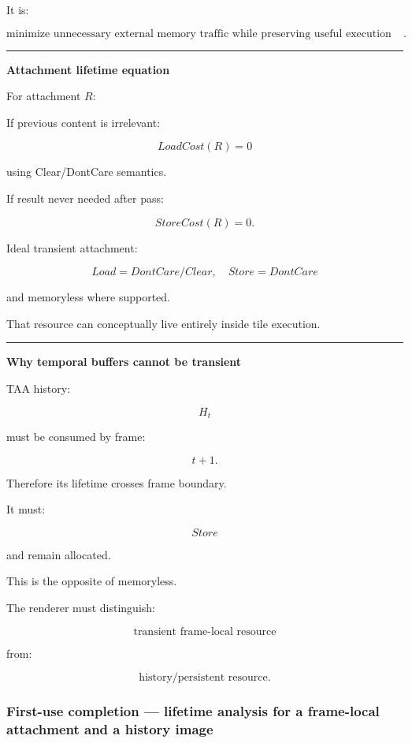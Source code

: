 It is:

\[
\boxed{
\text{minimize unnecessary external memory traffic while preserving useful execution structure}.
}
\]

\begin{center}\rule{0.5\linewidth}{0.5pt}\end{center}

\textbf{Attachment lifetime equation}

For attachment \(R\):

If previous content is irrelevant:

\[
LoadCost(R)=0
\]

using Clear/DontCare semantics.

If result never needed after pass:

\[
StoreCost(R)=0.
\]

Ideal transient attachment:

\[
\boxed{
Load=DontCare/Clear
,\quad
Store=DontCare
}
\]

and memoryless where supported.

That resource can conceptually live entirely inside tile execution.

\begin{center}\rule{0.5\linewidth}{0.5pt}\end{center}

\textbf{Why temporal buffers cannot be transient}

TAA history:

\[
H_t
\]

must be consumed by frame:

\[
t+1.
\]

Therefore its lifetime crosses frame boundary.

It must:

\[
Store
\]

and remain allocated.

This is the opposite of memoryless.

The renderer must distinguish:

\[
\boxed{
\text{transient frame-local resource}
}
\]

from:

\[
\boxed{
\text{history/persistent resource}.
}
\]

\subsubsection{First-use completion --- lifetime analysis for a frame-local attachment and a history image}\label{05-engine-i-ch024-first-use-completion-lifetime-analysis-for-a-frame-local-attachment-and-a-history-image}

